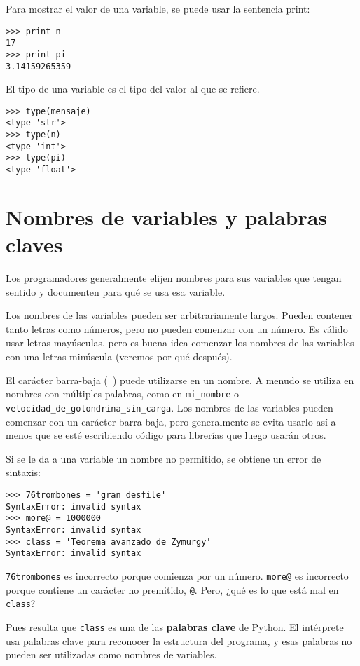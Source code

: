 Para mostrar el valor de una variable, se puede usar la sentencia print:

\beforeverb
\begin{verbatim}
>>> print n
17
>>> print pi
3.14159265359
\end{verbatim}
\afterverb
%
El tipo de una variable es el tipo del valor al que se refiere.

\beforeverb
\begin{verbatim}
>>> type(mensaje)
<type 'str'>
>>> type(n)
<type 'int'>
>>> type(pi)
<type 'float'>
\end{verbatim}
\afterverb
%

\section{Nombres de variables y palabras claves}

Los programadores generalmente elijen nombres para sus variables que
tengan sentido y documenten para qué se usa esa variable.

Los nombres de las variables pueden ser arbitrariamente largos. Pueden contener
tanto letras como números, pero no pueden comenzar con un número.
Es válido usar letras mayúsculas, pero es buena idea
comenzar los nombres de las variables con una letras minúscula (veremos
por qué después).

El carácter barra-baja (\verb"_") puede utilizarse en un nombre.
A menudo se utiliza en nombres con múltiples palabras, como en
\verb"mi_nombre" o \verb"velocidad_de_golondrina_sin_carga".
Los nombres de las variables pueden comenzar con un carácter barra-baja, pero
generalmente se evita usarlo así a menos que se esté escribiendo código
para librerías que luego usarán otros.


Si se le da a una variable un nombre no permitido, se obtiene un error de sintaxis:

\beforeverb
\begin{verbatim}
>>> 76trombones = 'gran desfile'
SyntaxError: invalid syntax
>>> more@ = 1000000
SyntaxError: invalid syntax
>>> class = 'Teorema avanzado de Zymurgy'
SyntaxError: invalid syntax
\end{verbatim}
\afterverb
%
{\tt 76trombones} es incorrecto porque comienza por un número.
{\tt more@} es incorrecto porque contiene un carácter no premitido, {\tt @}.
Pero, ¿qué es lo que está mal en {\tt class}?

Pues resulta que {\tt class} es una de las {\bf palabras clave} de Python. El
intérprete usa palabras clave para reconocer la estructura del programa,
y esas palabras no pueden ser utilizadas como nombres de variables.

